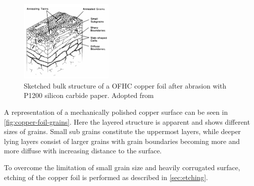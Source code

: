 \begin{figure}\centering
	\includegraphics[height=40mm]{./images/grain-structure-copper-foil}
	\caption{Sketched bulk structure of a OFHC copper foil after abrasion with P1200 silicon carbide paper. Adopted from \cite{turley_nature_1981}}
	\label{fig:copper-foil-grains}
\end{figure}

 A representation of a mechanically polished copper surface can be seen in \autoref{fig:copper-foil-grains}. Here the layered structure is apparent and shows different sizes of grains. Small sub grains constitute the uppermost layers, while deeper lying layers consist of larger grains with grain boundaries becoming more and more diffuse with increasing distance to the surface. 
 
To overcome the limitation of small grain size and heavily corrugated surface, etching of the copper foil is performed as described in \autoref{sec:etching}.